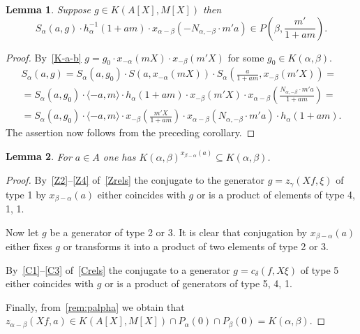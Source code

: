 \documentclass[oneside, 8pt]{amsart}
\newtheorem{lemma}{Lemma}
\theoremstyle{remark}
\theoremstyle{definition}
\numberwithin{equation}{section}
\begin{document}
\begin{lemma} Suppose $g \in K(A[X], M[X])$ then \[S_\alpha(a, g)\cdot  h^{-1}_\alpha(1 + am) \cdot x_{\alpha-\beta}(-N_{\alpha,-\beta}\cdot m'a) \in P\left(\beta, \frac{m'}{1 + am}\right).\] \end{lemma}
\begin{proof}
 By~\cref{K-a-b} $g = g_0 \cdot x_{-\alpha}(mX) \cdot x_{-\beta}(m'X)$ for some $g_0\in K(\alpha, \beta)$.
 \begin{multline} \nonumber S_\alpha(a, g) = S_\alpha(a, g_0) \cdot S(a, x_{-\alpha}(mX)) \cdot S_\alpha\left(\frac{a}{1+am}, x_{-\beta}(m'X)\right) = \\ = S_\alpha(a, g_0) \cdot \langle -a, m \rangle \cdot h_\alpha(1+am) \cdot x_{-\beta}(m'X) \cdot x_{\alpha-\beta}\left(\frac{N_{\alpha, -\beta} \cdot m'a}{1+am}\right) = \\ =
  S_\alpha(a, g_0) \cdot \langle -a, m \rangle \cdot  x_{-\beta}\left(\frac{m'X}{1+am}\right) \cdot x_{\alpha-\beta}\left(N_{\alpha, -\beta} \cdot m'a\right) \cdot h_\alpha(1+am). \end{multline}
The assertion now follows from the preceding corollary.
\end{proof}

  
\begin{lemma} For $a \in A$ one has $K(\alpha, \beta)^{x_{\beta - \alpha}(a)} \subseteq K(\alpha, \beta)$. \end{lemma}
\begin{proof}
 By~\eqref{Z2}--\eqref{Z4} of~\cref{Zrels} the conjugate to the generator $g=z_\gamma(Xf, \xi)$ of type 1 by $x_{\beta-\alpha}(a)$ either coincides with $g$ or is a product of elements of type 4, 1, 1.
 
 Now let $g$ be a generator of type 2 or 3. It is clear that conjugation by $x_{\beta-\alpha}(a)$ either fixes $g$ or transforms it into a product of two elements of type 2 or 3.
 
 By~\eqref{C1}--\eqref{C3} of~\cref{Crels} the conjugate to a generator $g = c_\delta(f, X\xi)$ of type 5 either coincides with $g$ or is a product of generators of type 5, 4, 1.
 
 Finally, from~\cref{rem:palpha} we obtain that $z_{\alpha-\beta}(Xf, a) \in K(A[X], M[X]) \cap P_\alpha(0) \cap P_{\beta}(0) = K(\alpha, \beta)$. \end{proof} 
  
\end{document}
